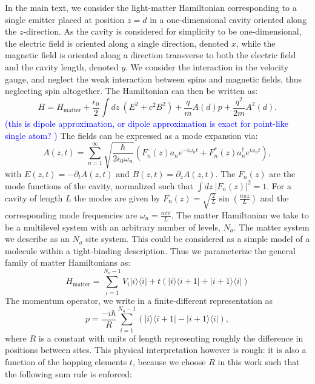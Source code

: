 \documentclass[aps,prb,twocolumn,
	groupedaddress,superscriptaddress,
	amsfonts,amssymb,amsmath,floatfix,
	citeautoscript]{revtex4-1}
\newcommand{\Jadd}[1]{\textcolor{blue}{#1}}
\begin{document}
In the main text, we consider the light-matter Hamiltonian corresponding to a single emitter placed at position $z=d$ in a one-dimensional cavity oriented along the $z$-direction. As the cavity is considered for simplicity to be one-dimensional, the electric field is oriented along a single direction, denoted $x$, while the magnetic field is oriented along a direction transverse to both the electric field and the cavity length, denoted $y$. We consider the interaction in the velocity gauge, and neglect the weak interaction between spins and magnetic fields, thus neglecting spin altogether. The Hamiltonian can then be written as:
\begin{equation}\label{eq:hamiltonian}
H = H_{\text{matter}}+\frac{\epsilon_0}{2}\int dz~(E^2+c^2B^2)+\frac{q}{m}A(d)p + \frac{q^2}{2m}A^2(d).
\end{equation}
\Jadd{(this is dipole approximation, or dipole approximation is exact for point-like single atom? )}
The fields can be expressed as a mode expansion via:
\begin{equation}\label{eq:mode_expansion}
A(z,t) = \sum\limits_{n=1}^{\infty} \sqrt{\frac{\hbar}{2\epsilon_0\omega_n }}(F_n(z)a_ne^{-i\omega_n t}+F^*_n(z)a_n^{\dagger}e^{i\omega_n t}),
\end{equation}
with $E(z,t) = -\partial_t A(z,t)$ and $B(z,t)=\partial_z A(z,t)$.  The $F_n(z)$ are the mode functions of the cavity, normalized such that $\int dz ~|F_n(z)|^2 = 1$. For a cavity of length $L$ the modes are given by $F_n(z) = \sqrt{\frac{2}{L}}\sin\left(\frac{n\pi z}{L} \right)$ and the corresponding mode frequencies are $\omega_n = \frac{n\pi c}{L}$. The matter Hamiltonian we take to be a multilevel system with an arbitrary number of levels, $N_a$. The matter system we describe as an $N_a$ site system. This could be considered as a simple model of a molecule within a tight-binding description. Thus we parameterize the general family of matter Hamiltonians as:
\begin{equation}\label{eq:matter_hamiltonian}
H_{\text{matter}} = \sum\limits_{i=1}^{{N_a-1}} V_i|i\rangle\langle i|+t(|i\rangle\langle i+1|+|i+1\rangle\langle i|) 
\end{equation}
The momentum operator, we write in a finite-different representation as
\begin{equation}\label{eq:momentum_operator}
p = \frac{-i\hbar}{R}\sum\limits_{i=1}^{N_a-1} \left(|i\rangle\langle i+1|-|i+1\rangle\langle i| \right),
\end{equation}
where $R$ is a constant with units of length representing roughly the difference in positions between sites. This physical interpretation however is rough: it is also a function of the hopping elements $t$, because we choose $R$ in this work such that the following sum rule is enforced: 
\end{document}
